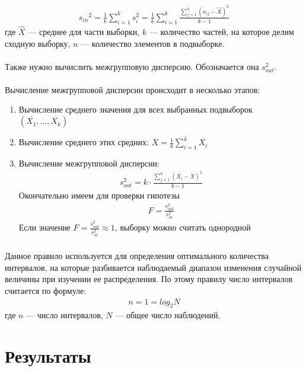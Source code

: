 \begin{gather}
    {s_{in}}^2 = \frac{1}{k}\sum_{i = 1}^{k}s_{i}^2 =  \frac{1}{k}\sum_{i=1}^{k}\frac{\sum_{j=1}^{n}(x_{ij}-\hat{X})^2}{k-1}
\end{gather}
где $\hat{X}$ — среднее для части выборки, $k$ — количество частей, на которое делим сходную выборку, $n$ — количество элементов в подвыборке.\\ \\ 
Также нужно вычислить межгрупповую дисперсию. Обозначается
она $s_{out}^2$.\\ \\ 
Вычисление межгрупповой дисперсии происходит в несколько этапов:
\begin{enumerate}
    \item Вычисление среднего значения для всех выбранных подвыборок $\left( \overline{X_1}, \dots, \overline{X_k} \right)$
    \item Вычисление среднего этих средних: $\overline{X} = \frac{1}{k}\sum_{i=1}^{k}\overline{X_i}$
    \item Вычисление межгрупповой дисперсии:
    \begin{gather}
        s_{out}^2 = k\cdot \frac{\sum_{j=1}^{n}(\overline{X_i} - \overline{X})^2}{k-1}
    \end{gather}
    Окончательно имеем для проверки гипотезы
    \begin{gather}
        F = \frac{s_{out}^2}{s_{in}^2}
    \end{gather}
    Если значение $F = \frac{s_{out}^2}{s_{in}^2} \approx 1$, выборку можно считать однородной
\end{enumerate}


    \subsubsection{}
    Данное правило используется для определения оптимального количества интервалов, на которые разбивается наблюдаемый диапазон изменения случайной величины при изучении ее распределения. По этому правилу число интервалов считается по формуле: 
    \begin{gather}
        n = 1 = log_{2}N
    \end{gather}
где $n$ — число интервалов, $N$ — общее число наблюдений.


\section{Результаты}
    